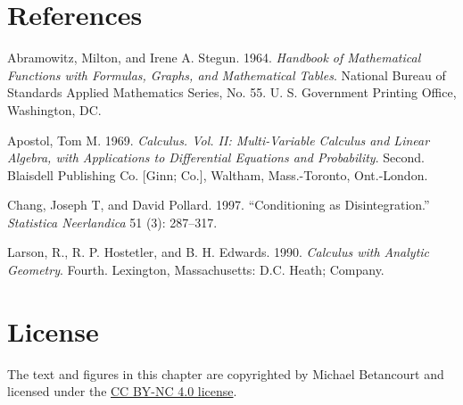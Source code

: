 \documentclass[
  letterpaper,
  DIV=11,
  numbers=noendperiod]{scrartcl}
\newlength{\cslhangindent}
\newenvironment{CSLReferences}[2] %
 {\begin{list}{}{%
  \setlength{\itemindent}{0pt}
  \setlength{\leftmargin}{0pt}
  \setlength{\parsep}{0pt}
  \ifodd #1
   \setlength{\leftmargin}{\cslhangindent}
   \setlength{\itemindent}{-1\cslhangindent}
  \fi
  \setlength{\itemsep}{#2\baselineskip}}}
 {\end{list}}
\begin{document}
\section*{References}\label{references}

\label{refs}
\begin{CSLReferences}{1}{0}
Abramowitz, Milton, and Irene A. Stegun. 1964. \emph{Handbook of
Mathematical Functions with Formulas, Graphs, and Mathematical Tables}.
National Bureau of Standards Applied Mathematics Series, No. 55. U. S.
Government Printing Office, Washington, DC.

Apostol, Tom M. 1969. \emph{Calculus. {V}ol. {II}: {M}ulti-Variable
Calculus and Linear Algebra, with Applications to Differential Equations
and Probability}. Second. Blaisdell Publishing Co. {[}Ginn; Co.{]},
Waltham, Mass.-Toronto, Ont.-London.

Chang, Joseph T, and David Pollard. 1997. {``Conditioning as
Disintegration.''} \emph{Statistica Neerlandica} 51 (3): 287--317.

Larson, R., R. P. Hostetler, and B. H. Edwards. 1990. \emph{Calculus
with Analytic Geometry}. Fourth. Lexington, Massachusetts: D.C. Heath;
Company.

\end{CSLReferences}

\section*{License}\label{license}

The text and figures in this chapter are copyrighted by Michael
Betancourt and licensed under the
\href{https://creativecommons.org/licenses/by-nc/4.0/}{CC BY-NC 4.0
license}.
\end{document}
